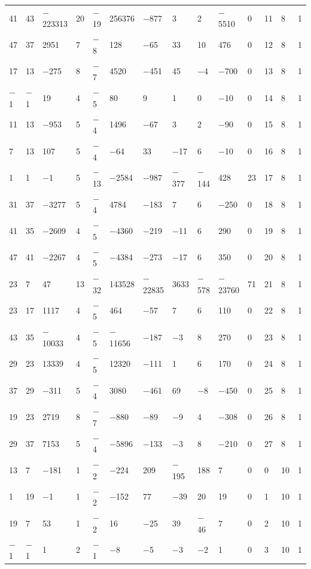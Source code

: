 \documentclass[pdftex]{sigma}
\numberwithin{equation}{section}
\theoremstyle{definition}
\numberwithin{table}{section}
\begin{document}
{\begin{paracol}{3}
\begin{supertabular}{|w{c}{.32cm}w{c}{.32cm}w{c}{.32cm}@{\hspace{.5cm}}w{c}{.2cm}w{c}{.2cm}|@{\hspace{\tabcolsep}}HHHHHHw{c}{.17cm}w{c}{.17cm}w{c}{.17cm}|}
			41 & 43 & $-$223313 & 20 & $-$19 & 256376 & $-$877 & 3 & 2 & $-$5510 & 0 & 11 & 8 & 1 \\
			47 & 37 & 2951 & 7 & $-$8 & 128 & $-$65 & 33 & 10 & 476 & 0 & 12 & 8 & 1 \\
			17 & 13 & $-$275 & 8 & $-$7 & 4520 & $-$451 & 45 & $-$4 & $-$700 & 0 & 13 & 8 & 1 \\
			$-$1 & $-$1 & 19 & 4 & $-$5 & 80 & 9 & 1 & 0 & $-$10 & 0 & 14 & 8 & 1 \\
			11 & 13 & $-$953 & 5 & $-$4 & 1496 & $-$67 & 3 & 2 & $-$90 & 0 & 15 & 8 & 1 \\
			7 & 13 & 107 & 5 & $-$4 & $-$64 & 33 & $-$17 & 6 & $-$10 & 0 & 16 & 8 & 1 \\
			1 & 1 & $-$1 & 5 & $-$13 & $-$2584 & $-$987 & $-$377 & $-$144 & 428 & 23 & 17 & 8 & 1 \\
			31 & 37 & $-$3277 & 5 & $-$4 & 4784 & $-$183 & 7 & 6 & $-$250 & 0 & 18 & 8 & 1 \\
			41 & 35 & $-$2609 & 4 & $-$5 & $-$4360 & $-$219 & $-$11 & 6 & 290 & 0 & 19 & 8 & 1 \\
			47 & 41 & $-$2267 & 4 & $-$5 & $-$4384 & $-$273 & $-$17 & 6 & 350 & 0 & 20 & 8 & 1 \\
			23 & 7 & 47 & 13 & $-$32 & 143528 & $-$22835 & 3633 & $-$578 & $-$23760 & 71 & 21 & 8 & 1 \\
			23 & 17 & 1117 & 4 & $-$5 & 464 & $-$57 & 7 & 6 & 110 & 0 & 22 & 8 & 1 \\
			43 & 35 & $-$10033 & 4 & $-$5 & $-$11656 & $-$187 & $-$3 & 8 & 270 & 0 & 23 & 8 & 1 \\
			29 & 23 & 13339 & 4 & $-$5 & 12320 & $-$111 & 1 & 6 & 170 & 0 & 24 & 8 & 1 \\
			37 & 29 & $-$311 & 5 & $-$4 & 3080 & $-$461 & 69 & $-$8 & $-$450 & 0 & 25 & 8 & 1 \\
			19 & 23 & 2719 & 8 & $-$7 & $-$880 & $-$89 & $-$9 & 4 & $-$308 & 0 & 26 & 8 & 1 \\
			29 & 37 & 7153 & 5 & $-$4 & $-$5896 & $-$133 & $-$3 & 8 & $-$210 & 0 & 27 & 8 & 1 \\
			13 & 7 & $-$181 & 1 & $-$2 & $-$224 & 209 & $-$195 & 188 & 7 & 0 & 0 & 10 & 1 \\
			1 & 19 & $-$1 & 1 & $-$2 & $-$152 & 77 & $-$39 & 20 & 19 & 0 & 1 & 10 & 1 \\
			19 & 7 & 53 & 1 & $-$2 & 16 & $-$25 & 39 & $-$46 & 7 & 0 & 2 & 10 & 1 \\
			$-$1 & $-$1 & 1 & 2 & $-$1 & $-$8 & $-$5 & $-$3 & $-$2 & 1 & 0 & 3 & 10 & 1 \\

\end{supertabular}
\end{paracol}}
\end{document}
